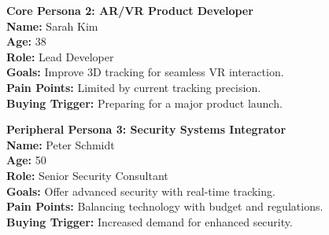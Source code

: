\textbf{Core Persona 2: AR/VR Product Developer} \\
\textbf{Name:} Sarah Kim \\
\textbf{Age:} 38 \\
\textbf{Role:} Lead Developer \\
\textbf{Goals:} Improve 3D tracking for seamless VR interaction. \\
\textbf{Pain Points:} Limited by current tracking precision. \\
\textbf{Buying Trigger:} Preparing for a major product launch.

\textbf{Peripheral Persona 3: Security Systems Integrator} \\
\textbf{Name:} Peter Schmidt \\
\textbf{Age:} 50 \\
\textbf{Role:} Senior Security Consultant \\
\textbf{Goals:} Offer advanced security with real-time tracking. \\
\textbf{Pain Points:} Balancing technology with budget and regulations. \\
\textbf{Buying Trigger:} Increased demand for enhanced security.

